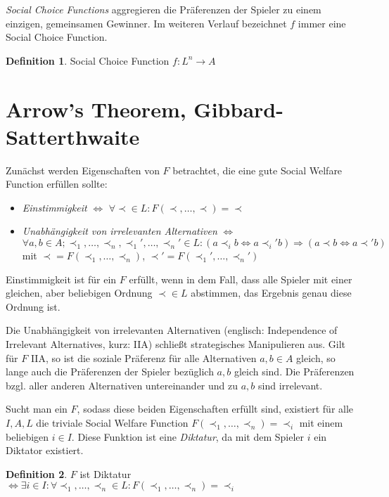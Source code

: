 \documentclass[a4paper,11pt]{article}
\theoremstyle{definition}
\newtheorem{definition}{Definition}
\theoremstyle{plain}
\theoremstyle{definition}
\begin{document}
\emph{Social Choice Functions} aggregieren die Präferenzen der Spieler zu einem einzigen, gemeinsamen Gewinner. Im weiteren Verlauf bezeichnet $f$ immer eine Social Choice Function.
\begin{definition}
	\label{def:socialchoicefunc}
	Social Choice Function $f : L^n \rightarrow A$
\end{definition}

\section{Arrow's Theorem, Gibbard-Satterthwaite}
Zunächst werden Eigenschaften von $F$ betrachtet, die eine gute Social Welfare Function erfüllen sollte:
\begin{itemize}
	\item \emph{Einstimmigkeit} $\iff$ $\forall \prec \in L: F(\prec, \ldots,\prec) = \prec$
	\item \emph{Unabhängigkeit von irrelevanten Alternativen}
	$\iff$ $\forall a, b \in A; \prec_1,\ldots,\prec_n, \prec_1', \ldots, \prec_n' \in L:	(a\prec_i b \iff a\prec_i' b) \Rightarrow (a\prec b \iff a\prec' b)$	mit $\prec = F(\prec_1, \ldots, \prec_n)$, $\prec' = F(\prec_1', \ldots, \prec_n')$
\end{itemize}

Einstimmigkeit ist für ein $F$ erfüllt, wenn in dem Fall, dass alle Spieler mit einer gleichen, aber beliebigen Ordnung $\prec \in L$ abstimmen, das Ergebnis genau diese Ordnung ist. 

Die Unabhängigkeit von irrelevanten Alternativen (englisch: Independence of Irrelevant Alternatives, kurz: IIA) schließt strategisches Manipulieren aus. Gilt für $F$ IIA, so ist die soziale Präferenz für alle Alternativen $a, b \in A$ gleich, so lange auch die Präferenzen der Spieler bezüglich $a, b$ gleich sind. Die Präferenzen bzgl. aller anderen Alternativen untereinander und zu $a, b$ sind irrelevant.

Sucht man ein $F$, sodass diese beiden Eigenschaften erfüllt sind, existiert für alle $I, A, L$ die triviale Social Welfare Function $F(\prec_1, \ldots, \prec_n) = \prec_i$ mit einem beliebigen $i \in I$. Diese Funktion ist eine \emph{Diktatur}, da mit dem Spieler $i$ ein Diktator existiert. 

\begin{definition}
	\label{def:diktatur}
	$F$ ist Diktatur$\iff\exists i \in I: \forall \prec_1, \ldots, \prec_n \in L: F(\prec_1, \ldots, \prec_n) = \prec_i$
\end{definition}
\end{document}
